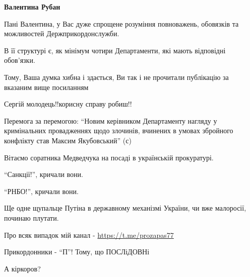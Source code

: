 \begin{itemize}
\begin{itemize}
\textbf{Валентина Рубан}

Пані Валентина, у Вас дуже спрощене розуміння повноважень, обовязків та
можливостей Держприкордонслужби.

В її структурі є, як мінімум чотири Департаменти, які мають відповідні
обов’язки.

Тому, Ваша думка хибна і здається, Ви так і не прочитали публікацію за вказаним
вище посиланням
\end{itemize}


Сергій молодець!!корисну справу робиш!!


Перемога за перемогою: \enquote{Новим керівником Департаменту нагляду у кримінальних
провадженнях щодо злочинів, вчинених в умовах збройного конфлікту став Максим
Якубовський} (с)

Вітаємо соратника Медведчука на посаді в українській прокуратурі.

\enquote{Санкції!}, кричали вони.

\enquote{РНБО!}, кричали вони.

Ще одне щупальце Путіна в державному механізмі України, чи вже малоросії,
починаю плутати.

Про всяк випадок мій канал - \url{https://t.me/prozapas77}

Прикордонники - \enquote{П}! Тому, що ПОСЛіДОВНі 🙂

А кіркоров?


\end{itemize}
